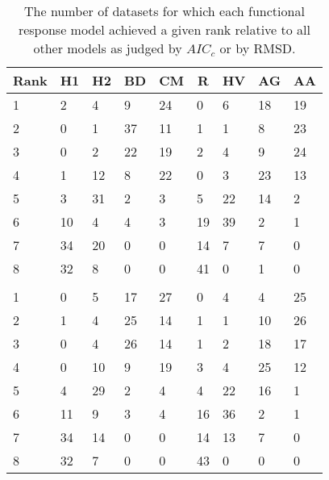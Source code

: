\begin{table}[!tbp]
\caption{The number of datasets for which each functional response model achieved a given rank relative to all other models as judged by $AIC_c$ or by RMSD.\label{table:AICc_and_RMSD_rankings}} 
\begin{center}
\begin{tabular}{lllllllll}
\hline\hline
\multicolumn{1}{l}{Rank}&\multicolumn{1}{c}{H1}&\multicolumn{1}{c}{H2}&\multicolumn{1}{c}{BD}&\multicolumn{1}{c}{CM}&\multicolumn{1}{c}{R}&\multicolumn{1}{c}{HV}&\multicolumn{1}{c}{AG}&\multicolumn{1}{c}{AA}\tabularnewline
\hline
1&2&4&9&24&0&6&18&19\tabularnewline
2&0&1&37&11&1&1&8&23\tabularnewline
3&0&2&22&19&2&4&9&24\tabularnewline
4&1&12&8&22&0&3&23&13\tabularnewline
5&3&31&2&3&5&22&14&2\tabularnewline
6&10&4&4&3&19&39&2&1\tabularnewline
7&34&20&0&0&14&7&7&0\tabularnewline
8&32&8&0&0&41&0&1&0\tabularnewline
&&&&&&&&\tabularnewline
1&0&5&17&27&0&4&4&25\tabularnewline
2&1&4&25&14&1&1&10&26\tabularnewline
3&0&4&26&14&1&2&18&17\tabularnewline
4&0&10&9&19&3&4&25&12\tabularnewline
5&4&29&2&4&4&22&16&1\tabularnewline
6&11&9&3&4&16&36&2&1\tabularnewline
7&34&14&0&0&14&13&7&0\tabularnewline
8&32&7&0&0&43&0&0&0\tabularnewline
\hline
\end{tabular}\end{center}
\end{table}
